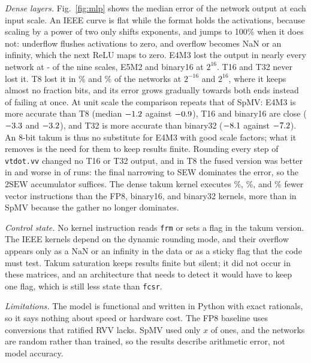 \documentclass[conference]{IEEEtran}
\newcommand{\code}[1]{\texttt{#1}}
\begin{document}
\emph{Dense layers.} Fig.~\ref{fig:mlp} shows the median error of the network
output at each input scale. An IEEE curve is flat while the format holds the
activations, because scaling by a power of two only shifts exponents, and jumps
to 100\% when it does not: underflow flushes activations to zero, and overflow
becomes NaN or an infinity, which the next ReLU maps to zero. E4M3 lost the
output in nearly every network at \the{}-\MlpUsableEFourMThree\relax{}
of the nine scales, E5M2 and binary16 at $2^{16}$. T16 and T32 never lost it.
T8 lost it in \MlpLostLowTEight\% and \MlpLostHighTEight\% of the networks at
$2^{-16}$ and $2^{16}$, where it keeps almost no fraction bits, and its error
grows gradually towards both ends instead of failing at once. At unit scale
the comparison repeats that of SpMV: E4M3 is more accurate than T8 (median
$-1.2$ against $-0.9$), T16 and binary16 are close
($-3.3$ and $-3.2$), and T32 is more accurate than
binary32 ($-8.1$ against $-7.2$). An 8-bit
takum is thus no substitute for E4M3 with good scale factors; what it removes
is the need for them to keep results finite. Rounding every step of
\code{vtdot.vv} changed no T16 or T32 output, and in T8 the fused version was
better in \MlpFusedBetterTEight{} and worse in \MlpFusedWorseTEight{} of
\MlpFusedRunsTEight{} runs: the final narrowing to SEW dominates the error, so
the $2\mathrm{SEW}$ accumulator suffices. The dense takum kernel executes
\MlpVecReductionEFourMThree\%, \MlpVecReductionFPSixteen\%, and
\MlpVecReductionFPThirtyTwo\% fewer vector instructions than the FP8, binary16,
and binary32 kernels, more than in SpMV because the gather no longer dominates.

\emph{Control state.} No kernel instruction reads \code{frm} or sets a flag in
the takum version. The IEEE kernels depend on the dynamic rounding mode, and
their overflow appears only as a NaN or an infinity in the data or as a sticky
flag that the code must test. Takum saturation keeps results finite but
silent; it did not occur in these matrices, and an architecture that needs to
detect it would have to keep one flag, which is still less state than
\code{fcsr}.

\emph{Limitations.} The model is functional and written in Python with exact
rationals, so it says nothing about speed or hardware cost. The FP8 baseline
uses conversions that ratified RVV lacks. SpMV used only $x$ of ones, and the
networks are random rather than trained, so the results describe arithmetic
error, not model accuracy.
\end{document}
